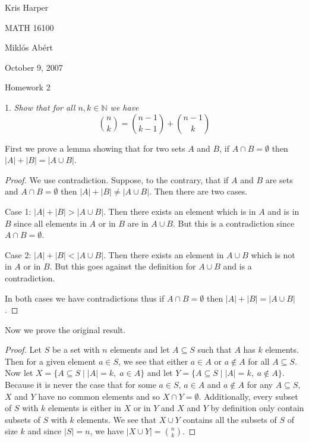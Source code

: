 \documentclass{article}
\begin{document}
\begin{flushright}
Kris Harper

MATH 16100

Mikl\'{o}s Ab\'{e}rt

October 9, 2007
\end{flushright}

\begin{center}
Homework 2
\end{center}

\begin{flushleft}

1. \textsl{Show that for all $n, k \in \mathbb{N}$ we have
\[
\binom {n} {k} = \binom {n-1} {k-1} + \binom {n-1} {k}
\]}\newline

First we prove a lemma showing that for two sets $A$ and $B$, if $A \cap B = \emptyset$ then $| A | + | B | = | A \cup B |$.
\begin{proof}
We use contradiction. Suppose, to the contrary, that if $A$ and $B$ are sets and $A \cap B = \emptyset$ then $| A | + | B | \neq | A \cup B |$. Then there are two cases.\newline

Case 1: $| A | + | B | > | A \cup B |$. Then there exists an element which is in $A$ and is in $B$ since all elements in $A$ or in $B$ are in $A \cup B$. But this is a contradiction since $A \cap B = \emptyset$.\newline

Case 2: $| A | + | B | < | A \cup B |$. Then there exists an element in $A \cup B$ which is not in $A$ or in $B$. But this goes against the definition for $A \cup B$ and is a contradiction.\newline

In both cases we have contradictions thus if $A \cap B = \emptyset$ then $| A | + | B | = | A \cup B |$.
\end{proof}

Now we prove the original result.

\begin{proof}
Let $S$ be a set with $n$ elements and let $A \subseteq S$ such that $A$ has $k$ elements. Then for a given element $a \in S$, we see that either $a \in A$ or $a \notin A$ for all $A \subseteq S$. Now let $X = \{ A \subseteq S \mid | A | = k, \; a \in A \}$ and let $Y = \{ A \subseteq S \mid | A | = k, \; a \notin A \}$. Because it is never the case that for some $a \in S$, $a \in A$ and $a \notin A$ for any $A \subseteq S$, $X$ and $Y$ have no common elements and so $X \cap Y = \emptyset$. Additionally, every subset of $S$ with $k$ elements is either in $X$ or in $Y$ and $X$ and $Y$ by definition only contain subsets of $S$ with $k$ elements. We see that $X \cup Y$ contains all the subsets of $S$ of size $k$ and since $| S | = n$, we have $| X \cup Y | = \binom{n}{k}$.\newline


\end{proof}
\end{flushleft}
\end{document}
